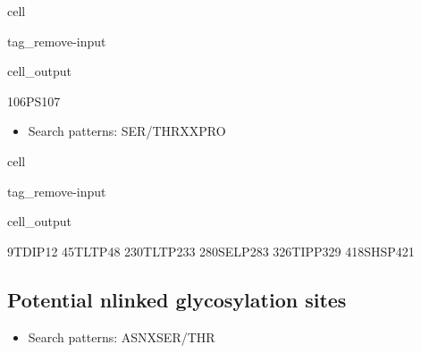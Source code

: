 \documentclass[letterpaper,10pt,english]{jupyterBook}
\begin{document}
\begin{sphinxuseclass}{cell}
\begin{sphinxuseclass}{tag_remove-input}\begin{sphinxVerbatimOutput}

\begin{sphinxuseclass}{cell_output}
\begin{sphinxVerbatim}[commandchars=\\\{\}]
106\PYGZhy{}PS\PYGZhy{}107
\end{sphinxVerbatim}

\end{sphinxuseclass}\end{sphinxVerbatimOutput}

\end{sphinxuseclass}
\end{sphinxuseclass}\begin{itemize}
\item {} 
\sphinxAtStartPar
Search patterns: SER/THR\sphinxhyphen{}X\sphinxhyphen{}X\sphinxhyphen{}PRO

\end{itemize}

\begin{sphinxuseclass}{cell}
\begin{sphinxuseclass}{tag_remove-input}\begin{sphinxVerbatimOutput}

\begin{sphinxuseclass}{cell_output}
\begin{sphinxVerbatim}[commandchars=\\\{\}]
9\PYGZhy{}TDIP\PYGZhy{}12
45\PYGZhy{}TLTP\PYGZhy{}48
230\PYGZhy{}TLTP\PYGZhy{}233
280\PYGZhy{}SELP\PYGZhy{}283
326\PYGZhy{}TIPP\PYGZhy{}329
418\PYGZhy{}SHSP\PYGZhy{}421
\end{sphinxVerbatim}

\end{sphinxuseclass}\end{sphinxVerbatimOutput}

\end{sphinxuseclass}
\end{sphinxuseclass}

\subsection{Potential n\sphinxhyphen{}linked glycosylation sites}
\label{\detokenize{ipynb/chapter1:potential-n-linked-glycosylation-sites}}\begin{itemize}
\item {} 
\sphinxAtStartPar
Search patterns: ASN\sphinxhyphen{}X\sphinxhyphen{}SER/THR

\end{itemize}
\end{document}
